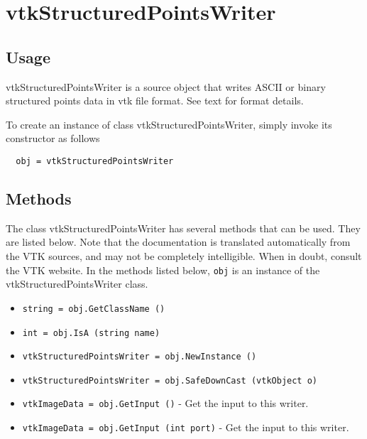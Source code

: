 \section{vtkStructuredPointsWriter}

\subsection{Usage}

 vtkStructuredPointsWriter is a source object that writes ASCII or binary 
 structured points data in vtk file format. See text for format details.

To create an instance of class vtkStructuredPointsWriter, simply
invoke its constructor as follows
\begin{verbatim}
  obj = vtkStructuredPointsWriter
\end{verbatim}
\subsection{Methods}

The class vtkStructuredPointsWriter has several methods that can be used.
  They are listed below.
Note that the documentation is translated automatically from the VTK sources,
and may not be completely intelligible.  When in doubt, consult the VTK website.
In the methods listed below, \verb|obj| is an instance of the vtkStructuredPointsWriter class.
\begin{itemize}
\item  \verb|string = obj.GetClassName ()|

\item  \verb|int = obj.IsA (string name)|

\item  \verb|vtkStructuredPointsWriter = obj.NewInstance ()|

\item  \verb|vtkStructuredPointsWriter = obj.SafeDownCast (vtkObject o)|

\item  \verb|vtkImageData = obj.GetInput ()| -  Get the input to this writer.

\item  \verb|vtkImageData = obj.GetInput (int port)| -  Get the input to this writer.

\end{itemize}

